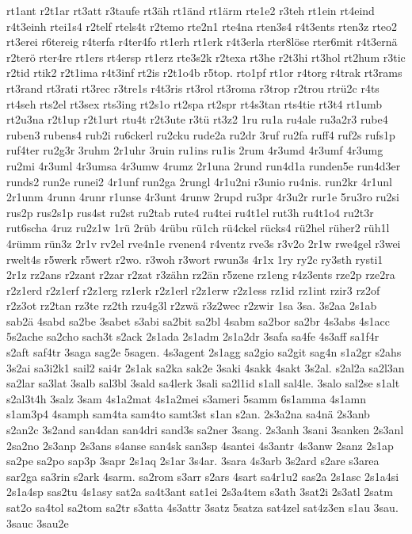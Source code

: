 {rt1ant
r2t1ar
rt3att
r3taufe
rt3äh
rt1änd
rt1ärm
rte1e2
r3teh
rt1ein
rt4eind
r4t3einh
rtei1s4
r2telf
rtels4t
r2temo
rte2n1
rte4na
rten3s4
r4t3ents
rten3z
rteo2
rt3erei
r6tereig
r4terfa
r4ter4fo
rt1erh
rt1erk
r4t3erla
rter8löse
rter6mit
r4t3ernä
r2terö
rter4re
rt1ers
rt4ersp
rt1erz
rte3s2k
r2texa
rt3he
r2t3hi
rt3hol
rt2hum
r3tic
r2tid
rtik2
r2t1ima
r4t3inf
rt2is
r2t1o4b
r5top.
rto1pf
rt1or
r4torg
r4trak
rt3rams
rt3rand
rt3rati
rt3rec
r3tre1s
r4t3ris
rt3rol
rt3roma
r3trop
r2trou
rtrü2c
r4ts
rt4seh
rts2el
rt3sex
rts3ing
rt2s1o
rt2spa
rt2spr
rt4s3tan
rts4tie
rt3t4
rt1umb
rt2u3na
r2t1up
r2t1urt
rtu4t
r2t3ute
r3tü
rt3z2
1ru
ru1a
ru4ale
ru3a2r3
rube4
ruben3
rubens4
rub2i
ru6ckerl
ru2cku
rude2a
ru2dr
3ruf
ru2fa
ruff4
ruf2s
rufs1p
ruf4ter
ru2g3r
3ruhm
2r1uhr
3ruin
ru1ins
ru1is
2rum
4r3umd
4r3umf
4r3umg
ru2mi
4r3uml
4r3umsa
4r3umw
4rumz
2r1una
2rund
run4d1a
runden5e
run4d3er
runds2
run2e
runei2
4r1unf
run2ga
2rungl
4r1u2ni
r3unio
ru4nis.
run2kr
4r1unl
2r1unm
4runn
4runr
r1unse
4r3unt
4runw
2rupd
ru3pr
4r3u2r
rur1e
5ru3ro
ru2si
rus2p
rus2s1p
rus4st
ru2st
ru2tab
rute4
ru4tei
ru4t1el
rut3h
ru4t1o4
ru2t3r
rut6scha
4ruz
ru2z1w
1rü
2rüb
4rübu
rü1ch
rü4ckel
rücks4
rü2hel
rüher2
rüh1l
4rümm
rün3z
2r1v
rv2el
rve4n1e
rvenen4
r4ventz
rve3s
r3v2o
2r1w
rwe4gel
r3wei
rwelt4s
r5werk
r5wert
r2wo.
r3woh
r3wort
rwun3s
4r1x
1ry
ry2c
ry3sth
rysti1
2r1z
rz2ans
r2zant
r2zar
r2zat
r3zähn
rz2än
r5zene
rz1eng
r4z3ents
rze2p
rze2ra
r2z1erd
r2z1erf
r2z1erg
rz1erk
r2z1erl
r2z1erw
r2z1ess
rz1id
rz1int
rzir3
rz2of
r2z3ot
rz2tan
rz3te
rz2th
rzu4g3l
r2zwä
r3z2wec
r2zwir
1sa
3sa.
3s2aa
2s1ab
sab2ä
4sabd
sa2be
3sabet
s3abi
sa2bit
sa2bl
4sabm
sa2bor
sa2br
4s3abs
4s1acc
5s2ache
sa2cho
sach3t
s2ack
2s1ada
2s1adm
2s1a2dr
3safa
sa4fe
4s3aff
sa1f4r
s2aft
saf4tr
3saga
sag2e
5sagen.
4s3agent
2s1agg
sa2gio
sa2git
sag4n
s1a2gr
s2ahs
3s2ai
sa3i2k1
sail2
sai4r
2s1ak
sa2ka
sak2e
3saki
4sakk
4sakt
3s2al.
s2al2a
sa2l3an
sa2lar
sa3lat
3salb
sal3bl
3sald
sa4lerk
3sali
sa2l1id
s1all
sal4le.
3salo
sal2se
s1alt
s2al3t4h
3salz
3sam
4s1a2mat
4s1a2mei
s3ameri
5samm
6s1amma
4s1amn
s1am3p4
4samph
sam4ta
sam4to
samt3st
s1an
s2an.
2s3a2na
sa4nä
2s3anb
s2an2c
3s2and
san4dan
san4dri
sand3s
sa2ner
3sang.
2s3anh
3sani
3sanken
2s3anl
2sa2no
2s3anp
2s3ans
s4anse
san4sk
san3sp
4santei
4s3antr
4s3anw
2sanz
2s1ap
sa2pe
sa2po
sap3p
3sapr
2s1aq
2s1ar
3s4ar.
3sara
4s3arb
3s2ard
s2are
s3area
sar2ga
sa3rin
s2ark
4sarm.
sa2rom
s3arr
s2ars
4sart
sa4r1u2
sas2a
2s1asc
2s1a4si
2s1a4sp
sas2tu
4s1asy
sat2a
sa4t3ant
sat1ei
2s3a4tem
s3ath
3sat2i
2s3atl
2satm
sat2o
sa4tol
sa2tom
sa2tr
s3atta
4s3attr
3satz
5satza
sat4zel
sat4z3en
s1au
3sau.
3sauc
3sau2e
}
